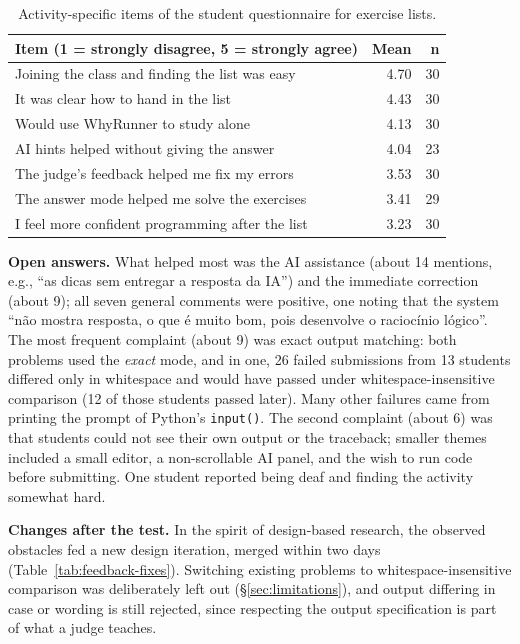 \documentclass[12pt]{article}
\begin{document}
\begin{table}[ht]
\centering
\footnotesize
\caption{Activity-specific items of the student questionnaire for exercise lists.}
\label{tab:survey-items}
\begin{tabular}{lrr}
\hline
\textbf{Item (1 = strongly disagree, 5 = strongly agree)} & \textbf{Mean} & \textbf{n} \\
\hline
Joining the class and finding the list was easy    & 4.70 & 30 \\
It was clear how to hand in the list               & 4.43 & 30 \\
Would use WhyRunner to study alone                 & 4.13 & 30 \\
AI hints helped without giving the answer          & 4.04 & 23 \\
The judge's feedback helped me fix my errors       & 3.53 & 30 \\
The answer mode helped me solve the exercises      & 3.41 & 29 \\
I feel more confident programming after the list   & 3.23 & 30 \\
\hline
\end{tabular}
\end{table}

\textbf{Open answers.} What helped most was the AI assistance (about 14 mentions, e.g., ``as dicas sem entregar a resposta da IA'') and the immediate correction (about 9); all seven general comments were positive, one noting that the system ``não mostra resposta, o que é muito bom, pois desenvolve o raciocínio lógico''. The most frequent complaint (about 9) was exact output matching: both problems used the \emph{exact} mode, and in one, 26 failed submissions from 13 students differed only in whitespace and would have passed under whitespace-insensitive comparison (12 of those students passed later). Many other failures came from printing the prompt of Python's \texttt{input()}. The second complaint (about 6) was that students could not see their own output or the traceback; smaller themes included a small editor, a non-scrollable AI panel, and the wish to run code before submitting. One student reported being deaf and finding the activity somewhat hard.

\textbf{Changes after the test.} In the spirit of design-based research, the observed obstacles fed a new design iteration, merged within two days (Table~\ref{tab:feedback-fixes}). Switching existing problems to whitespace-insensitive comparison was deliberately left out (\S\ref{sec:limitations}), and output differing in case or wording is still rejected, since respecting the output specification is part of what a judge teaches.
\end{document}
